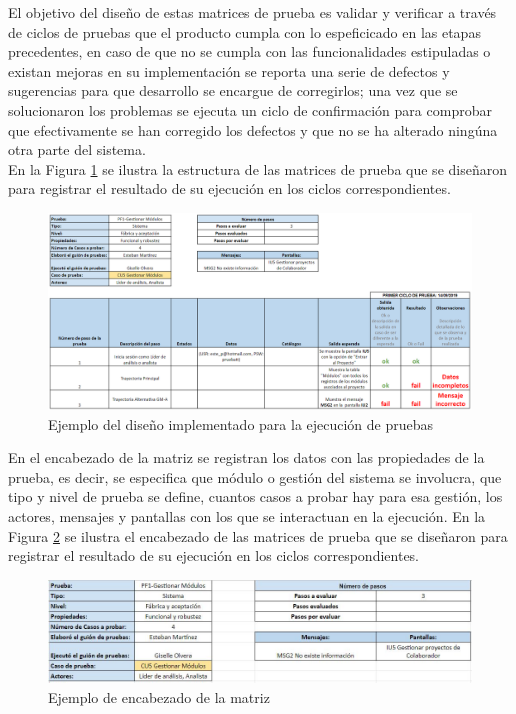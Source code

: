 El objetivo del diseño de estas matrices de prueba es validar y verificar a través de ciclos de pruebas que el producto cumpla con lo espeficicado en las etapas precedentes, en caso de que no se cumpla con las funcionalidades estipuladas o existan mejoras en su implementación se reporta una serie de defectos y sugerencias para que desarrollo se encargue de corregirlos; una vez que se solucionaron los problemas se ejecuta un ciclo de confirmación para comprobar que efectivamente se han corregido los defectos y que no se ha alterado ningúna otra parte del sistema.\\

En la Figura \ref{fig:estructurap} se ilustra la estructura de las matrices de prueba que se diseñaron para registrar el resultado de su ejecución en los ciclos correspondientes.

\begin{figure}[H]
	\begin{center}
		\includegraphics[width=1.1\textwidth]{images/pruebas/diseno/estructurap}
		\caption{Ejemplo del diseño implementado para la ejecución de pruebas}
		\label{fig:estructurap}
	\end{center}
\end{figure}

\newpage

En el encabezado de la matriz se registran los datos con las propiedades de la prueba, es decir, se especifica que módulo o gestión del sistema se involucra, que tipo y nivel de prueba se define, cuantos casos a probar hay para esa gestión, los actores, mensajes y pantallas con los que se interactuan en la ejecución. En la Figura \ref{fig:encabezado} se ilustra el encabezado de las matrices de prueba que se diseñaron para registrar el resultado de su ejecución en los ciclos correspondientes.

\begin{figure}[H]
	\begin{center}
		\includegraphics[width=.95\textwidth]{images/pruebas/diseno/encabezado}
		\caption{Ejemplo de encabezado de la matriz}
		\label{fig:encabezado}
	\end{center}
\end{figure}

